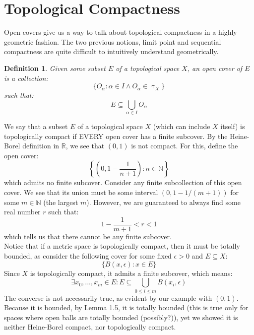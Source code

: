 \documentclass[10pt,letterpaper]{article} %
\newtheorem{defn}{Definition}[section]
\begin{document}
\section{Topological Compactness}
Open covers give us a way to talk about topological compactness in a highly geometric fashion. The two previous notions, limit point and sequential compactness are quite difficult to intuitively understand geometrically.
\begin{defn}
Given some subset $E$ of a topological space $X$, an open cover of $E$ is a collection:
\begin{equation*}
\{O_\alpha: \alpha \in I \land O_\alpha \in \uptau_X\}
\end{equation*}
such that:
\begin{equation*}
E \subseteq \bigcup_{\alpha \in I} O_\alpha
\end{equation*}
\end{defn}
We say that a subset $E$ of a topological space $X$ (which can include $X$ itself) is topologically compact if EVERY open cover has a finite subcover. By the Heine-Borel definition in $\mathbb{R}$, we see that $(0, 1)$ is not compact. For this, define the open cover:
\begin{equation*}
\left\{\left(0, 1-\frac{1}{n+1}\right) : n \in \mathbb{N}\right\}
\end{equation*}
which admits no finite subcover. Consider any finite subcollection of this open cover. We see that its union must be some interval $(0, 1-1/(m+1))$ for some $m \in \mathbb{N}$ (the largest $m$). However, we are guaranteed to always find some real number $r$ such that:
\begin{equation*}
1 - \frac{1}{m+1} < r < 1
\end{equation*}
which tells us that there cannot be any finite subcover.\\

Notice that if a metric space is topologically compact, then it must be totally bounded, as consider the following cover for some fixed $\epsilon > 0$ and $E \subseteq X$:
\begin{equation*}
\{B(x, \epsilon): x \in E\}
\end{equation*}
Since $X$ is topologically compact, it admits a finite subcover, which means:
\begin{equation*}
\exists x_0,...,x_m \in E: E \subseteq \bigcup_{0 \leqslant i \leqslant m}B(x_i, \epsilon)
\end{equation*}
The converse is not necessarily true, as evident by our example with $(0, 1)$. Because it is bounded, by Lemma 1.5, it is totally bounded (this is true only for spaces where open balls are totally bounded (possibly?)), yet we showed it is neither Heine-Borel compact, nor topologically compact.
\end{document}
